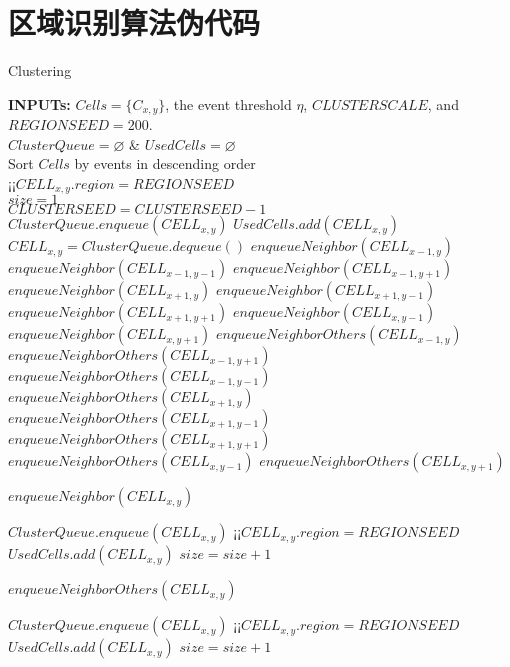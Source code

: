 \chapter{区域识别算法伪代码}
\begin{algorithm}\label{algorithm_connecting}
\caption{Clustering}
\begin{algorithmic}
\STATE \textbf{INPUTs:} $Cells=\{C_{x,y}\}$, the event threshold $\eta$, 
$CLUSTERSCALE$, and $REGIONSEED=200$.\\
\STATE $ClusterQueue=\varnothing$ \& $UsedCells=\varnothing$\\
\STATE Sort $Cells$ by events in descending order\\
\STATE¡¡$CELL_{x,y}.region=REGIONSEED$\\
\STATE  $size=1$\\
\STATE  $CLUSTERSEED=CLUSTERSEED-1$\\
\STATE $ClusterQueue.enqueue(CELL_{x,y})$
\STATE $UsedCells.add(CELL_{x,y})$
\STATE $CELL_{x,y}=ClusterQueue.dequeue()$
\STATE $enqueueNeighbor(CELL_{x-1,y})$
\STATE $enqueueNeighbor(CELL_{x-1,y-1})$
\STATE $enqueueNeighbor(CELL_{x-1,y+1})$
\STATE $enqueueNeighbor(CELL_{x+1,y})$
\STATE $enqueueNeighbor(CELL_{x+1,y-1})$
\STATE $enqueueNeighbor(CELL_{x+1,y+1})$
\STATE $enqueueNeighbor(CELL_{x,y-1})$
\STATE $enqueueNeighbor(CELL_{x,y+1})$
\ELSE
\STATE $enqueueNeighborOthers(CELL_{x-1,y})$
\STATE $enqueueNeighborOthers(CELL_{x-1,y+1})$
\STATE $enqueueNeighborOthers(CELL_{x-1,y-1})$
\STATE $enqueueNeighborOthers(CELL_{x+1,y})$
\STATE $enqueueNeighborOthers(CELL_{x+1,y-1})$
\STATE $enqueueNeighborOthers(CELL_{x+1,y+1})$
\STATE $enqueueNeighborOthers(CELL_{x,y-1})$
\STATE $enqueueNeighborOthers(CELL_{x,y+1})$
\ENDIF
\ENDWHILE
\ENDIF
\ENDFOR
\end{algorithmic}
\end{algorithm}



\begin{algorithm}
\caption{$enqueueNeighbor(CELL_{x,y})$}
\begin{algorithmic}
\STATE $ClusterQueue.enqueue(CELL_{x,y})$
\STATE¡¡$CELL_{x,y}.region=REGIONSEED$
\STATE $UsedCells.add(CELL_{x,y})$
\STATE $size=size+1$
\ENDIF
\end{algorithmic}
\end{algorithm}

\begin{algorithm}
\caption{$enqueueNeighborOthers(CELL_{x,y})$}
\begin{algorithmic}
\STATE $ClusterQueue.enqueue(CELL_{x,y})$
\STATE¡¡$CELL_{x,y}.region=REGIONSEED$\\
\STATE $UsedCells.add(CELL_{x,y})$
\STATE $size=size+1$
\ENDIF
\end{algorithmic}
\end{algorithm}
